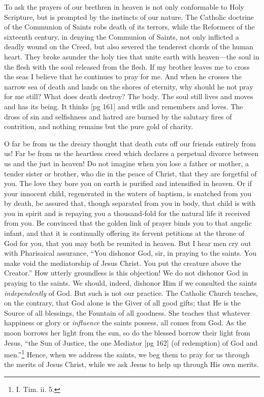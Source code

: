 To ask the prayers of our brethren in heaven is
not only conformable to Holy Scripture, but is
prompted by the instincts of our nature. The
Catholic doctrine of the Communion of Saints robs
death of its terrors, while the Reformers of the
sixteenth century, in denying the Communion of
Saints, not only inflicted a deadly wound on the
Creed, but also severed the tenderest chords of
the human heart. They broke asunder the holy
ties that unite earth with heaven—the soul in the
flesh with the soul released from the flesh. If my
brother leaves me to cross the seas I believe that
he continues to pray for me. And when he crosses
the narrow sea of death and lands on the shores
of eternity, why should he not pray for me still?
What does death destroy? The body. The soul
still lives and moves and has its being. It thinks
[pg 161]
and wills and remembers and loves. The dross of
sin and selfishness and hatred are burned by the
salutary fires of contrition, and nothing remains
but the pure gold of charity.

O far be from us the dreary thought that death
cuts off our friends entirely from us! Far be from
us the heartless creed which declares a perpetual
divorce between us and the just in heaven! Do not
imagine when you lose a father or mother, a tender
sister or brother, who die in the peace of Christ,
that they are forgetful of you. The love they bore
you on earth is purified and intensified in heaven.
Or if your innocent child, regenerated in the waters
of baptism, is snatched from you by death, be assured
that, though separated from you in body, that
child is with you in spirit and is repaying you a
thousand-fold for the natural life it received from
you. Be convinced that the golden link of prayer
binds you to that angelic infant, and that it is continually
offering its fervent petitions at the throne
of God for you, that you may both be reunited in
heaven. But I hear men cry out with Pharisaical
assurance, “You dishonor God, sir, in praying to
the saints. You make void the mediatorship of
Jesus Christ. You put the creature above the Creator.”
How utterly groundless is this objection! We
do not dishonor God in praying to the saints. We
should, indeed, dishonor Him if we consulted the
saints \emph{independently} of God. But such is not our
practice. The Catholic Church teaches, on the contrary,
that God alone is the Giver of all good gifts;
that He is the Source of all blessings, the Fountain
of all goodness. She teaches that whatever happiness
or glory or \emph{influence} the saints possess, all
comes from God. As the moon borrows her light
from the sun, so do the blessed borrow their light
from Jesus, “the Sun of Justice, the one Mediator
[pg 162]
(of redemption) of God and
men.”\footnote{I. Tim. ii. 5.} Hence,
when we address the saints, we beg them to pray
for us through the merits of Jesus Christ, while we
ask Jesus to help up through His own merits.


